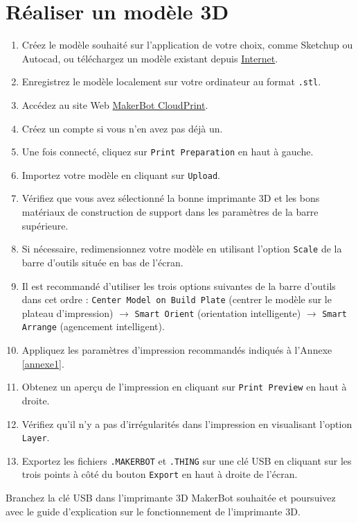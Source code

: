 \documentclass{Thesis}
\begin{document}
\section{Réaliser un modèle 3D}
\begin{enumerate}
    \item Créez le modèle souhaité sur l'application de votre choix, comme Sketchup ou Autocad, ou téléchargez un modèle existant depuis \href{https://www.thingiverse.com/}{Internet}.
    \item Enregistrez le modèle localement sur votre ordinateur au format \texttt{.stl}.
    \item Accédez au site Web \href{https://login.makerbot.com/login?redirect=https%3A%2F%2Fcloudprint.makerbot.com%2Fprint}{MakerBot CloudPrint}.
    \item Créez un compte si vous n'en avez pas déjà un.
    \item Une fois connecté, cliquez sur \texttt{Print Preparation} en haut à gauche.
    \item Importez votre modèle en cliquant sur \texttt{Upload}.
    \item Vérifiez que vous avez sélectionné la bonne imprimante 3D et les bons matériaux de construction de support dans les paramètres de la barre supérieure.
    \item Si nécessaire, redimensionnez votre modèle en utilisant l'option \texttt{Scale} de la barre d'outils située en bas de l'écran.
    \item Il est recommandé d'utiliser les trois options suivantes de la barre d'outils dans cet ordre : \texttt{Center Model on Build Plate} (centrer le modèle sur le plateau d'impression) $\rightarrow$ \texttt{Smart Orient} (orientation intelligente) $\rightarrow$ \texttt{Smart Arrange} (agencement intelligent).
    \item Appliquez les paramètres d'impression recommandés indiqués à l'Annexe \ref{annexe1}.
    \item Obtenez un aperçu de l'impression en cliquant sur \texttt{Print Preview} en haut à droite.
    \item Vérifiez qu'il n'y a pas d'irrégularités dans l'impression en visualisant l'option \texttt{Layer}.
    \item Exportez les fichiers \texttt{.MAKERBOT} et \texttt{.THING} sur une clé USB en cliquant sur les trois points à côté du bouton \texttt{Export} en haut à droite de l'écran.
\end{enumerate}
Branchez la clé USB dans l'imprimante 3D MakerBot souhaitée et poursuivez avec le guide d'explication sur le fonctionnement de l'imprimante 3D.
\end{document}
